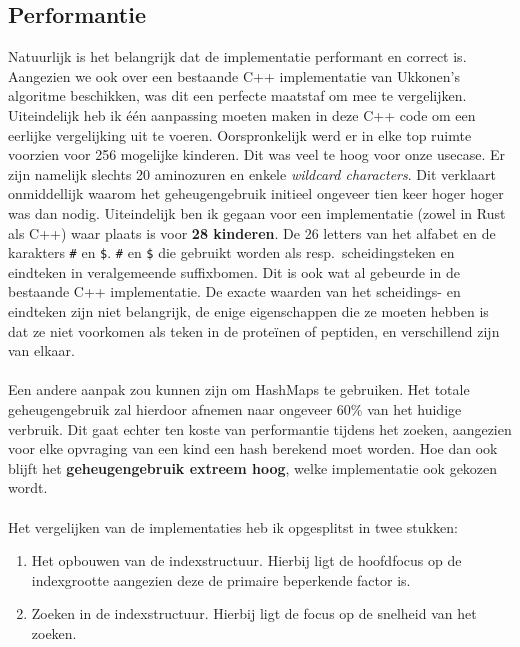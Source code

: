 \subsection{Performantie}\label{subsec:performantie}
Natuurlijk is het belangrijk dat de implementatie performant en correct is.
Aangezien we ook over een bestaande C++ implementatie van Ukkonen's algoritme beschikken, was dit een perfecte maatstaf om mee te vergelijken.
Uiteindelijk heb ik één aanpassing moeten maken in deze C++ code om een eerlijke vergelijking uit te voeren.
Oorspronkelijk werd er in elke top ruimte voorzien voor 256 mogelijke kinderen.
Dit was veel te hoog voor onze usecase.
Er zijn namelijk slechts 20 aminozuren en enkele \textit{wildcard characters}.
Dit verklaart onmiddellijk waarom het geheugengebruik initieel ongeveer tien keer hoger hoger was dan nodig.
Uiteindelijk ben ik gegaan voor een implementatie (zowel in Rust als C++) waar plaats is voor \textbf{28 kinderen}.
De 26 letters van het alfabet en de karakters \texttt{\#} en \texttt{\$}.
\texttt{\#} en \texttt{\$} die gebruikt worden als resp.~scheidingsteken en eindteken in veralgemeende suffixbomen.
Dit is ook wat al gebeurde in de bestaande C++ implementatie.
De exacte waarden van het scheidings- en eindteken zijn niet belangrijk, de enige eigenschappen die ze moeten hebben is dat ze niet voorkomen als teken in de proteïnen of peptiden, en verschillend zijn van elkaar.
\\ \\
Een andere aanpak zou kunnen zijn om HashMaps te gebruiken.
Het totale geheugengebruik zal hierdoor afnemen naar ongeveer 60\% van het huidige verbruik.
Dit gaat echter ten koste van performantie tijdens het zoeken, aangezien voor elke opvraging van een kind een hash berekend moet worden.
Hoe dan ook blijft het \textbf{geheugengebruik extreem hoog}, welke implementatie ook gekozen wordt.
\\ \\
Het vergelijken van de implementaties heb ik opgesplitst in twee stukken:
\begin{enumerate}
    \item Het opbouwen van de indexstructuur.
    Hierbij ligt de hoofdfocus op de indexgrootte aangezien deze de primaire beperkende factor is.
    \item Zoeken in de indexstructuur.
    Hierbij ligt de focus op de snelheid van het zoeken.
\end{enumerate}


